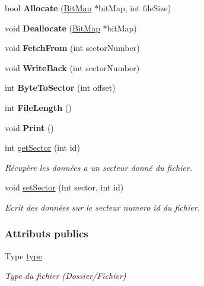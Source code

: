 \begin{DoxyCompactItemize}
\item 
\hypertarget{class_file_header_a2fb90f63470e10c847393e124763fd1a}{}\label{class_file_header_a2fb90f63470e10c847393e124763fd1a} 
bool {\bfseries Allocate} (\hyperlink{class_bit_map}{Bit\+Map} $\ast$bit\+Map, int file\+Size)
\item 
\hypertarget{class_file_header_a0d8a66db0af2460ccb27edd8d2331179}{}\label{class_file_header_a0d8a66db0af2460ccb27edd8d2331179} 
void {\bfseries Deallocate} (\hyperlink{class_bit_map}{Bit\+Map} $\ast$bit\+Map)
\item 
\hypertarget{class_file_header_aa85564cee98fc9592df08cc5e4a2efc6}{}\label{class_file_header_aa85564cee98fc9592df08cc5e4a2efc6} 
void {\bfseries Fetch\+From} (int sector\+Number)
\item 
\hypertarget{class_file_header_ab896cc7dd7274e3f8072da2c7d9beee8}{}\label{class_file_header_ab896cc7dd7274e3f8072da2c7d9beee8} 
void {\bfseries Write\+Back} (int sector\+Number)
\item 
\hypertarget{class_file_header_adacbe1c1af441d0b1e978c65a05d60f2}{}\label{class_file_header_adacbe1c1af441d0b1e978c65a05d60f2} 
int {\bfseries Byte\+To\+Sector} (int offset)
\item 
\hypertarget{class_file_header_a676d88bbc37d3d108625be75d637a8e6}{}\label{class_file_header_a676d88bbc37d3d108625be75d637a8e6} 
int {\bfseries File\+Length} ()
\item 
\hypertarget{class_file_header_a57b661cda2c4d51ee06cc29e7ea0a0c0}{}\label{class_file_header_a57b661cda2c4d51ee06cc29e7ea0a0c0} 
void {\bfseries Print} ()
\item 
int \hyperlink{class_file_header_acd6d2c54e660c15dbfb4d367f722f88d}{get\+Sector} (int id)
\begin{DoxyCompactList}\small\item\em Récupère les données a un secteur donné du fichier. \end{DoxyCompactList}\item 
void \hyperlink{class_file_header_a97a47f8bf9c3200f64b799815b9b9bbd}{set\+Sector} (int sector, int id)
\begin{DoxyCompactList}\small\item\em Ecrit des données sur le secteur numero id du fichier. \end{DoxyCompactList}\end{DoxyCompactItemize}
\subsubsection*{Attributs publics}
\begin{DoxyCompactItemize}
\item 
\hypertarget{class_file_header_ac34633b420f66e4467b33bded8ab6372}{}\label{class_file_header_ac34633b420f66e4467b33bded8ab6372} 
Type \hyperlink{class_file_header_ac34633b420f66e4467b33bded8ab6372}{type}
\begin{DoxyCompactList}\small\item\em Type du fichier (Dossier/\+Fichier) \end{DoxyCompactList}\end{DoxyCompactItemize}
